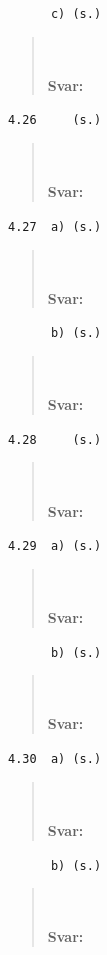 \documentclass[a4paper]{article}
\newcommand{\tskcol}[1]{\textcolor{tskcol}{#1}}
\begin{document}
\texttt{\tskcol{~~~~~~c) (s.)}}
\begin{quotation}
	\noindent
	\\ \\
	\textbf{Svar:}
\end{quotation}

\texttt{\tskcol{4.26~~~~ (s.)}}
\begin{quotation}
	\noindent
	\\ \\
	\textbf{Svar:}
\end{quotation}

\texttt{\tskcol{4.27~~a) (s.)}}
\begin{quotation}
	\noindent
	\\ \\
	\textbf{Svar:}
\end{quotation}

\texttt{\tskcol{~~~~~~b) (s.)}}
\begin{quotation}
	\noindent
	\\ \\
	\textbf{Svar:}
\end{quotation}

\texttt{\tskcol{4.28~~~~ (s.)}}
\begin{quotation}
	\noindent
	\\ \\
	\textbf{Svar:}
\end{quotation}

\texttt{\tskcol{4.29~~a) (s.)}}
\begin{quotation}
	\noindent
	\\ \\
	\textbf{Svar:}
\end{quotation}

\texttt{\tskcol{~~~~~~b) (s.)}}
\begin{quotation}
	\noindent
	\\ \\
	\textbf{Svar:}
\end{quotation}

\texttt{\tskcol{4.30~~a) (s.)}}
\begin{quotation}
	\noindent
	\\ \\
	\textbf{Svar:}
\end{quotation}

\texttt{\tskcol{~~~~~~b) (s.)}}
\begin{quotation}
	\noindent
	\\ \\
	\textbf{Svar:}
\end{quotation}
\end{document}
